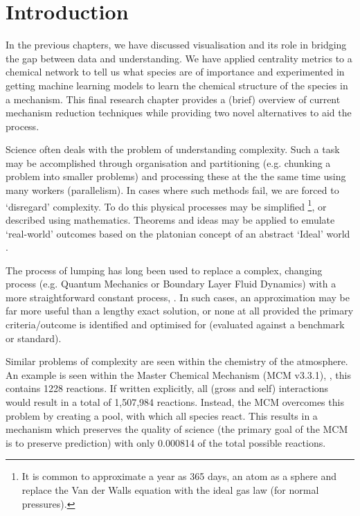 

\section{Introduction}

In the previous chapters, we have discussed visualisation and its role in bridging the gap between data and understanding. We have applied centrality metrics to a chemical network to tell us what species are of importance and experimented in getting machine learning models to learn the chemical structure of the species in a mechanism. This final research chapter provides a (brief) overview of current mechanism reduction techniques while providing two novel alternatives to aid the process.

Science often deals with the problem of understanding complexity. Such a task may be accomplished through organisation and partitioning (e.g. chunking a problem into smaller problems) and processing these at the the same time using many workers (parallelism). In cases where such methods fail, we are forced to `disregard' complexity. To do this physical processes may be simplified \footnote{It is common to approximate a year as 365 days, an atom as a sphere and replace the Van der Walls equation with the ideal gas law (for normal pressures).}, or described using mathematics. Theorems and ideas may be applied to emulate `real-world' outcomes based on the platonian concept of an abstract `Ideal' world \citep{platoform, physapprox}.

 The process of lumping has long been used to replace a complex, changing process (e.g. Quantum Mechanics or Boundary Layer Fluid Dynamics) with a more straightforward constant process, \citep{approx}. In such cases, an approximation may be far more useful than a lengthy exact solution, or none at all provided the primary criteria/outcome is identified and optimised for (evaluated against a benchmark or standard).

Similar problems of complexity are seen within the chemistry of the atmosphere. An example is seen within the Master Chemical Mechanism (MCM v3.3.1), \citep{mcm}, this contains 1228  reactions. If written explicitly, all  (gross and self) interactions would result in a total of 1,507,984 reactions. Instead, the MCM overcomes this problem by creating a  pool, with which all  species react. This results in a mechanism which preserves the quality of science (the primary goal of the MCM is to preserve  prediction) with only 0.000814 of the total possible  reactions.

